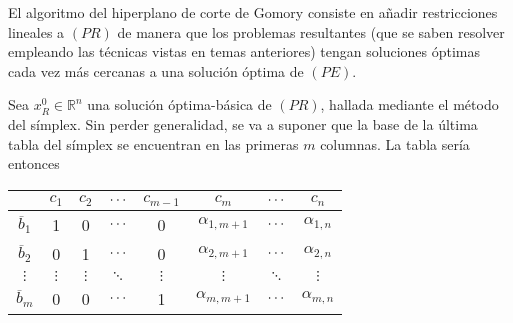 \documentclass[11pt]{report}
\theoremstyle{mytheorem}
\theoremstyle{mydefinition}
\theoremstyle{myexample}
\newcommand{\R}{\mathbb R}
\begin{document}
El algoritmo del hiperplano de corte de Gomory consiste en añadir restricciones lineales a $(PR)$ de manera que los problemas resultantes (que se saben resolver empleando las técnicas vistas en temas anteriores) tengan soluciones óptimas cada vez más cercanas a una solución óptima de $(PE)$.



Sea $x^0_R \in \R^n$ una solución óptima-básica de $(PR)$, hallada mediante el método del símplex. Sin perder generalidad, se va a suponer que la base de la última tabla del símplex se encuentran en las primeras $m$ columnas. La tabla sería entonces

\begin{center}
\setlength\extrarowheight{2.5pt}
\begin{tabular}{|c|c|c|c|c|c|c|c|}
    \cline{2-8}
    
    \multicolumn{1}{c|}{} & \multicolumn{1}{c}{$c_1$} & \multicolumn{1}{c}{$c_2$} & \multicolumn{1}{c}{$\mathellipsis$} & \multicolumn{1}{c}{$c_{m-1}$} & \multicolumn{1}{c}{$c_m$} & \multicolumn{1}{c}{$\mathellipsis$} & \multicolumn{1}{c|}{$c_n$} \\[2.5pt] \hline
    
    $\overline{b}_1$ & \multicolumn{1}{c}{1} & \multicolumn{1}{c}{0} & \multicolumn{1}{c}{$\mathellipsis$} & \multicolumn{1}{c}{0} & \multicolumn{1}{c}{$\alpha_{1,m+1}$} & \multicolumn{1}{c}{$\mathellipsis$} & \multicolumn{1}{c|}{$\alpha_{1,n}$} \\[2.5pt]

    $\overline{b}_2$ & \multicolumn{1}{c}{0} & \multicolumn{1}{c}{1} & \multicolumn{1}{c}{$\mathellipsis$} & \multicolumn{1}{c}{0} & \multicolumn{1}{c}{$\alpha_{2,m+1}$} & \multicolumn{1}{c}{$\mathellipsis$} & \multicolumn{1}{c|}{$\alpha_{2,n}$} \\[2.5pt]
    
    $\vdots$ & \multicolumn{1}{c}{$\vdots$} & \multicolumn{1}{c}{$\vdots$} & \multicolumn{1}{c}{$\ddots$} & \multicolumn{1}{c}{$\vdots$} & \multicolumn{1}{c}{$\vdots$} & \multicolumn{1}{c}{$\ddots$} & \multicolumn{1}{c|}{$\vdots$} \\[2.5pt]
    
    $\overline{b}_m$ & \multicolumn{1}{c}{0} & \multicolumn{1}{c}{0} & \multicolumn{1}{c}{$\mathellipsis$} & \multicolumn{1}{c}{1} & \multicolumn{1}{c}{$\alpha_{m,m+1}$} & \multicolumn{1}{c}{$\mathellipsis$} & \multicolumn{1}{c|}{$\alpha_{m,n}$} \\[2.5pt] \cline{1-8}
\end{tabular}
\end{center}
\end{document}
